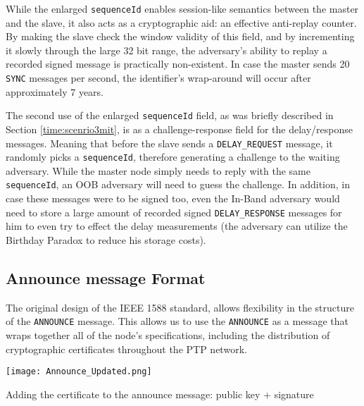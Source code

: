 \documentclass[11pt]{article}
\begin{document}
While the enlarged \texttt{sequenceId} enables session-like semantics between the master and the slave, it also acts as a cryptographic aid: an effective anti-replay counter. By making the slave check the window validity of this field, and by incrementing it slowly through the large 32 bit range, the adversary's ability to replay a recorded signed message is practically non-existent. In case the master sends 20 \texttt{SYNC} messages per second, the identifier's wrap-around will occur after approximately 7 years.



The second use of the enlarged \texttt{sequenceId} field, as was briefly described in Section \ref{time:scenrio3mit}, is as a challenge-response field for the delay/response messages. Meaning that before the slave sends a \texttt{DELAY_REQUEST} message, it randomly picks a \texttt{sequenceId}, therefore generating a challenge to the waiting adversary. While the master node simply needs to reply with the same \texttt{sequenceId}, an OOB adversary will need to guess the challenge. In addition, in case these messages were to be signed too, even the In-Band adversary would need to store a large amount of recorded signed \texttt{DELAY_RESPONSE} messages for him to even try to effect the delay measurements (the adversary can utilize the Birthday Paradox to reduce his storage costs).



\subsection{Announce message Format}\label{sol:announce}

The original design of the IEEE 1588 standard, allows flexibility in the structure of the \texttt{ANNOUNCE} message. This allows us to use the \texttt{ANNOUNCE} as a message that wraps together all of the node's specifications, including the distribution of cryptographic certificates throughout the PTP network.



\begin{table}[t]

\centerline{\texttt{[image: Announce\_Updated.png]}}

\caption{Adding the certificate to the announce message: public key + signature}

\label{announce message}

\end{table}
\end{document}
